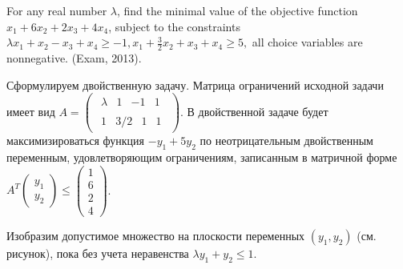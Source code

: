 \begin{problem}
For any real number $\lambda $, find the minimal value of the objective function $x_{1} +6x_{2} +2x_{3} +4x_{4} $, subject to the constraints $\lambda x_{1} +x_{2} -x_{3} +x_{4} \ge -1,  x_{1} +\frac{3}{2} x_{2} +x_{3} +x_{4} \ge 5,$ all choice variables are nonnegative. (Exam, 2013).
\end{problem}


\begin{solution}
Сформулируем двойственную задачу. Матрица ограничений исходной задачи имеет вид $A=\left(\begin{array}{c} {\begin{array}{cccc} {\lambda } & {1} & {-1} & {1} \end{array}} \\ {\begin{array}{cccc} {1} & {3/2} & {1} & {1} \end{array}} \end{array}\right)$. В двойственной задаче будет максимизироваться функция $-y_{1} +5y_{2} $ по неотрицательным двойственным переменным, удовлетворяющим ограничениям, записанным в матричной форме $A^{T} \left(\begin{array}{c} {y_{1} } \\ {y_{2} } \end{array}\right)\le \left(\begin{array}{c} {1} \\ {6} \\ {2} \\ {4} \end{array}\right)$.

Изобразим допустимое множество на плоскости переменных $(y_{1} ,y_{2} )$ (см. рисунок), пока без учета неравенства $\lambda y_{1} +y_{2} \le 1$.




\end{solution}
